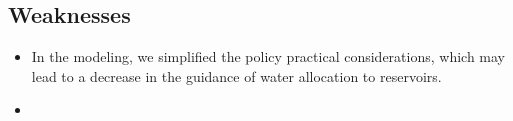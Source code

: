 \subsection{Weaknesses}
\begin{itemize}
    \item In the modeling, we simplified the policy practical considerations, which may lead to a decrease in the guidance of water allocation to reservoirs.
    \item 
\end{itemize}